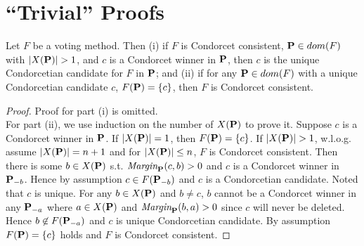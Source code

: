 \chapter{``Trivial'' Proofs}

\begin{lemma}
    Let $F$ be a voting method. Then (i) if $F$ is Condorcet consistent, $\mathbf{P} \in dom(F)$ with $|X(\mathbf{P})| > 1$, and $c$ is a Condorcet winner in $\mathbf{P}$, then $c$ is the unique Condorcetian candidate for $F$ in $\mathbf{P}$; and (ii) if for any $\mathbf{P} \in dom(F)$ with a unique Condorcetian candidate $c$, $F(\mathbf{P}) = \{c\}$, then $F$ is Condorcet consistent.
\end{lemma}

\begin{proof}
    Proof for part (i) is omitted.\\
    For part (ii), we use induction on the number of $X(\mathbf{P})$ to prove it. Suppose $c$ is a Condorcet winner in $\mathbf{P}$. If $|X(\mathbf{P})| = 1$, then $F(\mathbf{P}) = \{c\}$. If $|X(\mathbf{P})| > 1$, w.l.o.g. assume $|X(\mathbf{P})| = n+1$ and for $|X(\mathbf{P})| \leq n$, $F$ is Condorcet consistent. Then there is some $b \in X(\mathbf{P})$ s.t. $\textit{Margin}_{\mathbf{P}}(c,b) > 0$ and $c$ is a Condorcet winner in $\mathbf{P}_{-b}$. Hence by assumption $c \in F(\mathbf{P}_{-b})$ and $c$ is a Condorcetian candidate. Noted that $c$ is unique. For any $b \in X(\mathbf{P})$ and $b \neq c$, $b$ cannot be a Condorcet winner in any $\mathbf{P}_{-a}$ where $a \in X(\mathbf{P})$ and $\textit{Margin}_{\mathbf{P}}(b,a) > 0$ since $c$ will never be deleted. Hence $b \not \in F(\mathbf{P}_{-a})$ and $c$ is unique Condorcetian candidate. By assumption $F(\mathbf{P}) = \{c\}$ holds and $F$ is Condorcet consistent. 
\end{proof}